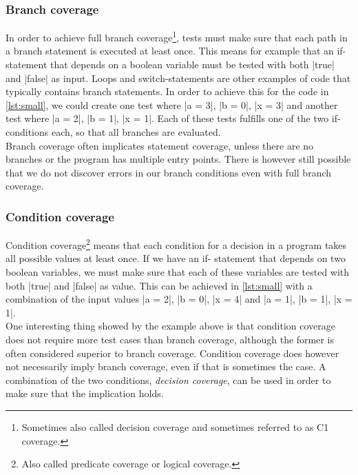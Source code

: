 \subsubsection{Branch coverage}

In order to achieve full branch coverage\footnote{Sometimes also called
decision coverage and sometimes referred to as C1 coverage.}, tests must
make sure that each path in a branch statement is executed at least
once. This means for example that an if-statement that depends on a
boolean variable must be tested with both |true| and |false| as input.
Loops and switch-statements are other examples of code that typically
contains branch statements. In order to achieve this for the code in
\ref{lst:small}, we could create one test where |a = 3|, |b = 0|,
|x = 3| and another test where |a = 2|, |b = 1|, |x = 1|. Each of these
tests fulfills one of the two if-conditions each, so that all branches
are evaluated.\\

Branch coverage often implicates statement coverage, unless there are no
branches or the program has multiple entry points. There is however
still possible that we do not discover errors in our branch conditions
even with full branch coverage.\\


\subsubsection{Condition coverage}

Condition coverage\footnote{Also called predicate coverage or logical
coverage.} means that each condition for a decision in a program takes
all possible values at least once. If we have an if- statement that
depends on two boolean variables, we must make sure that each of these
variables are tested with both |true| and |false| as value. This can be
achieved in \ref{lst:small} with a combination of the input values
|a = 2|, |b = 0|, |x = 4| and |a = 1|, |b = 1|, |x = 1|.\\

One interesting thing showed by the example above is that condition
coverage does not require more test cases than branch coverage, although
the former is often considered superior to branch coverage. Condition
coverage does however not necessarily imply branch coverage, even if
that is sometimes the case. A combination of the two conditions,
\emph{decision coverage}, can be used in order to make sure that the
implication holds.\\


